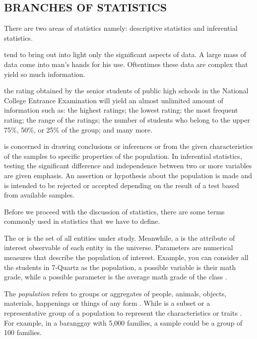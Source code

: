 \subsection*{BRANCHES OF STATISTICS}
There are two areas of statistics namely: descriptive statistics and inferential
statistics.
\begin{definition}
 tend to bring out into light only the significant aspects of data.
A large mass of data come into man's hands for his use. Oftentimes these data are
complex that yield so much information.
\end{definition}
\begin{example}
\Item the rating obtained by the senior students of public high schools in the
National College Entrance Examination will yield an almost unlimited amount of information
such as: the highest ratings; the lowest rating; the most frequent rating; the range of the ratings;
the number of students who belong to the upper 75\%, 50\%, or 25\% of the group; and many
more.
\end{example}
\begin{definition}
 is concerned in drawing conclusions or inferences or from the
given characteristics of the samples to specific properties of the population. In
inferential statistics, testing the significant difference and independence between
two or more variables are given emphasis. An assertion or hypothesis about the
population is made and is intended to be rejected or accepted depending on the
result of a test based from available samples. %
\end{definition}
Before we proceed with the discussion of statistics, there are some terms commonly used in
statistics that we have to define.
\begin{definition}
The  or  is the set of all entities under study. Meanwhile, a 
is the attribute of interest observable of each entity in the universe. Parameters are
numerical measures that describe the population of interest. Example, you can
consider all the students in 7-Quartz as the population, a possible variable is their
math grade, while a possible parameter is the average math grade of the class \parencite{psasrtc}.
\end{definition}
The \textit{population} refers to groups or aggregates of people, animals, objects, materials,
happenings or things of any form \parencite{punzalan}. While  is a subset or a
representative group of a population to represent the characteristics or traits \parencite{basilio}. For example, in a baranggay with 5,000 families, a sample could be a group of 100
families.

